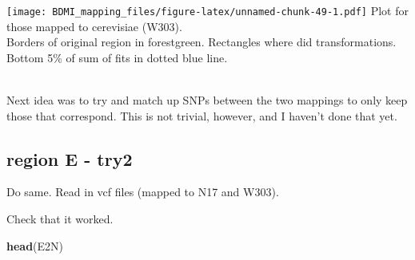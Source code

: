 \documentclass[
]{article}
\newenvironment{Shaded}{\begin{snugshade}}{\end{snugshade}}
\newcommand{\FunctionTok}[1]{\textcolor[rgb]{0.13,0.29,0.53}{\textbf{#1}}}
\newcommand{\NormalTok}[1]{#1}
\begin{document}
\texttt{[image: BDMI\_mapping\_files/figure-latex/unnamed-chunk-49-1.pdf]}
Plot for those mapped to cerevisiae (W303).\\
Borders of original region in forestgreen. Rectangles where did
transformations.\\
Bottom 5\% of sum of fits in dotted blue line.\\
\strut \\
Next idea was to try and match up SNPs between the two mappings to only
keep those that correspond. This is not trivial, however, and I haven't
done that yet.\\

\hypertarget{region-e---try2}{%
\subsection{region E - try2}\label{region-e---try2}}

Do same. Read in vcf files (mapped to N17 and W303).

Check that it worked.

\begin{Shaded}
\begin{Highlighting}[]
\FunctionTok{head}\NormalTok{(E2N)}
\end{Highlighting}
\end{Shaded}
\end{document}

